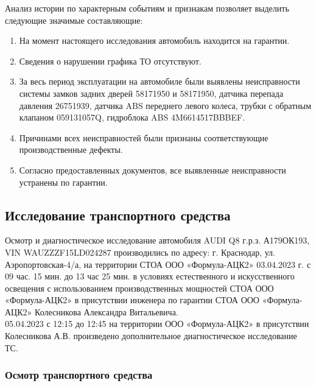 \noindent Анализ истории по характерным событиям и признакам позволяет выделить следующие значимые составляющие:
\begin{enumerate}
\item  
На момент настоящего исследования автомобиль находится на гарантии.
\item  
Сведения о нарушении графика ТО отсутствуют.
\item  
За весь период эксплуатации на автомобиле были выявлены неисправности системы замков  задних дверей  58171950 и 58171950, датчика перепада давления 26751939, датчика ABS переднего левого колеса, трубки с обратным клапаном 059131057Q,  гидроблока ABS 4M6614517BBBEF.
\item 
Причинами  всех неисправностей были признаны соответствующие производственные дефекты.  
\item 
Согласно предоставленных документов, все выявленные неисправности устранены по гарантии. 
\end{enumerate}


% 
\subsection{Исследование транспортного средства}

Осмотр и диагностическое исследование  автомобиля AUDI Q8 г.р.з. А179ОК193, VIN WAUZZZF15LD024287  производились  по адресу: г. Краснодар, ул. Аэропортовская-4/а, на территории СТОА ООО «Формула-АЦК2» 03.04.2023 г. с 09 час. 15 мин. до 13 час 25 мин.  в условиях естественного и искусственного освещения с использованием производственных мощностей СТОА ООО «Формула-АЦК2» в присутствии инженера по гарантии СТОА ООО «Формула-АЦК2» Колесникова Александра Витальевича.\\
 05.04.2023 с 12:15 до 12:45 на территории  ООО «Формула-АЦК2» в присутствии Колесникова А.В. произведено дополнительное  диагностическое исследование ТС.

\subsubsection{Осмотр транспортного средства}


